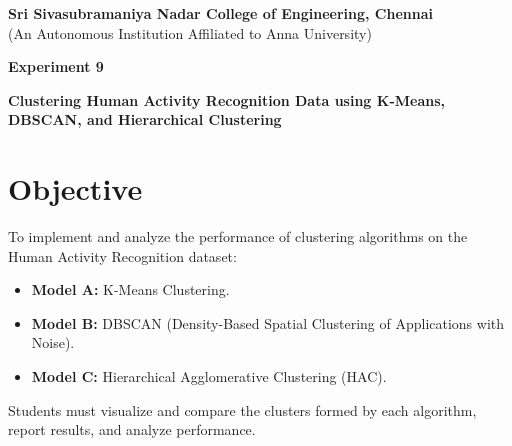 \documentclass[11pt]{article}
\begin{document}
\begin{center}
    \large \textbf{Sri Sivasubramaniya Nadar College of Engineering, Chennai} \\
    (An Autonomous Institution Affiliated to Anna University) \\
    \vspace{0.3cm}
\end{center}

\begin{table}[!h]
\renewcommand{\arraystretch}{1.5}
\end{table}

\begin{center}
    \textbf{\Large Experiment 9}
\end{center}

\begin{center}
    \textbf{Clustering Human Activity Recognition Data using K-Means, DBSCAN, and Hierarchical Clustering}
\end{center}

\section{Objective}
To implement and analyze the performance of clustering algorithms on the Human Activity Recognition dataset:
\begin{itemize}
    \item \textbf{Model A:} K-Means Clustering.
    \item \textbf{Model B:} DBSCAN (Density-Based Spatial Clustering of Applications with Noise).
    \item \textbf{Model C:} Hierarchical Agglomerative Clustering (HAC).
\end{itemize}
Students must visualize and compare the clusters formed by each algorithm, report results, and analyze performance.
\end{document}
